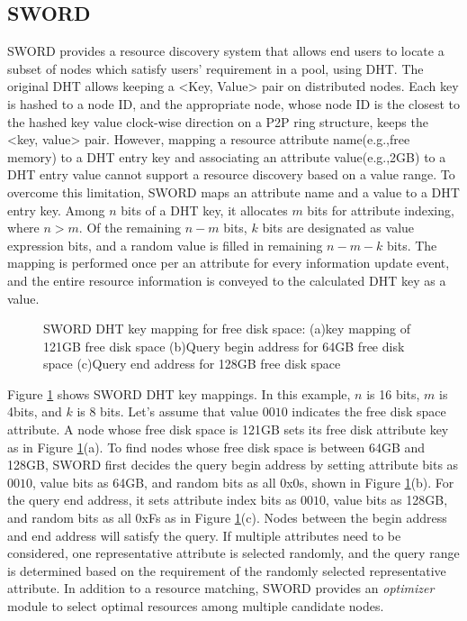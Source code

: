 \documentclass{acm_proc_article-sp}
\begin{document}
\subsection{SWORD}
SWORD provides a resource discovery system that allows end users to locate a subset of nodes which satisfy users' requirement in a pool, using DHT.
The original DHT allows keeping a <Key, Value> pair on distributed nodes. 
Each key is hashed to a node ID, and the appropriate node, whose node ID is the closest to the hashed key value clock-wise direction on a P2P ring structure\cite{chord}\cite{pastry}, keeps the <key, value> pair. 
However, mapping a resource attribute name(e.g.,free memory) to a DHT entry key and associating an attribute value(e.g.,2GB) to a DHT entry value cannot support a resource discovery based on a value range. 
To overcome this limitation, SWORD maps an attribute name and a value to a DHT entry key. Among $n$ bits of a DHT key, it allocates $m$ bits for attribute indexing, where $n>m$. 
Of the remaining $n-m$ bits, $k$ bits are designated as value expression bits, and a random value is filled in remaining $n-m-k$ bits.
The mapping is performed once per an attribute for every information update event, and the entire resource information is conveyed to the calculated DHT key as a value.
\begin{figure}
\centering
{}
\caption{\label{fig:sword}SWORD DHT key mapping for free disk space: (a)key mapping of 121GB free disk space (b)Query begin address for 64GB free disk space (c)Query end address for 128GB free disk space}
\end{figure}
Figure \ref{fig:sword} shows SWORD DHT key mappings. In this example, $n$ is 16 bits, $m$ is 4bits, and $k$ is 8 bits. Let's assume that value $0010$ indicates the free disk space attribute.
A node whose free disk space is 121GB sets its free disk attribute key as in Figure \ref{fig:sword}(a).
To find nodes whose free disk space is between 64GB and 128GB, SWORD first decides the query begin address by setting attribute bits as $0010$, value bits as 64GB, and random bits as all 0x0s, shown in Figure \ref{fig:sword}(b).
For the query end address, it sets attribute index bits as $0010$, value bits as 128GB, and random bits as all 0xFs as in Figure \ref{fig:sword}(c).
Nodes between the begin address and end address will satisfy the query. 
If multiple attributes need to be considered, one representative attribute is selected randomly, and the query range is determined based on the requirement of the randomly selected representative attribute.
In addition to a resource matching, SWORD provides an \textit{optimizer} module to select optimal resources among multiple candidate nodes. 
\end{document}
